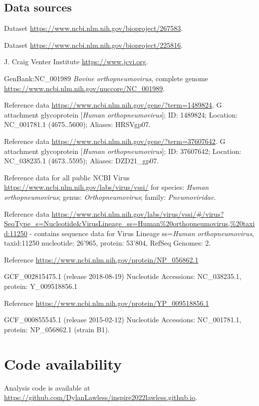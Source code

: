 \documentclass[9pt,lineno]{elife}  %
\begin{document}
\subsection{Data sources}
\begin{description}[noitemsep]
\item Dataset \url{https://www.ncbi.nlm.nih.gov/bioproject/267583}.
\item Dataset \url{https://www.ncbi.nlm.nih.gov/bioproject/225816}.
\item J. Craig Venter Institute \url{https://www.jcvi.org}.
\item GenBank:NC\_001989 \textit{Bovine orthopneumovirus}, complete genome \url{https://www.ncbi.nlm.nih.gov/nuccore/NC_001989}.
\item Reference data \url{https://www.ncbi.nlm.nih.gov/gene/?term=1489824}.
G attachment glycoprotein [\textit{Human orthopneumovirus}]; ID: 1489824; Location: NC\_001781.1 (4675..5600); Aliases: HRSVgp07.
\item Reference data \url{https://www.ncbi.nlm.nih.gov/gene/?term=37607642}. 
G attachment glycoprotein [\textit{Human orthopneumovirus}]; ID: 37607642; Location: NC\_038235.1 (4673..5595); Aliases: DZD21\_gp07.
\item Reference data for all public NCBI Virus 
\url{https://www.ncbi.nlm.nih.gov/labs/virus/vssi/} for species: \textit{Human orthopneumovirus}; genus: \textit{Orthopneumovirus}; family: \textit{Pneumoviridae}.
\item Reference data \url{https://www.ncbi.nlm.nih.gov/labs/virus/vssi/#/virus?SeqType_s=Nucleotide&VirusLineage_ss=Human\%20orthopneumovirus,\%20taxid:11250}
- contains sequence data for 
Virus Lineage ss=\textit{Human orthopneumovirus}, taxid:11250
nucleotide: 26’965, 
protein: 53’804, 
RefSeq Genomes: 2.
\item Reference \url{https://www.ncbi.nlm.nih.gov/protein/NP_056862.1}
\item GCF\_002815475.1	(release 2018-08-19) Nucleotide Accessions: NC\_038235.1, protein: Y\_009518856.1
\item Reference \url{https://www.ncbi.nlm.nih.gov/protein/YP_009518856.1}
\item GCF\_000855545.1	(release 2015-02-12) Nucleotide Accessions: NC\_001781.1, protein: NP\_056862.1 (strain B1).
\end{description}

\section{Code availability}
Analysis code is available at \url{https://github.com/DylanLawless/inspire2022lawless.github.io}.
\end{document}

